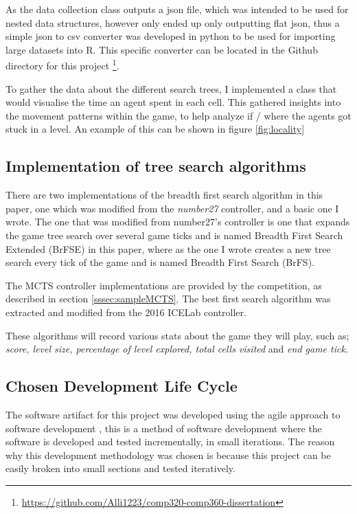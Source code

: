 \documentclass[journal]{IEEEtran}
\begin{document}
	As the data collection class outputs a json file, which was intended to be used for nested data structures, however only ended up only outputting flat json, thus a simple json to csv converter was developed in python to be used for importing large datasets into R. This specific converter can be located in the Github directory for this project \footnote{\url{https://github.com/Alli1223/comp320-comp360-dissertation}}.

	To gather the data about the different search trees, I implemented a class that would visualise the time an agent spent in each cell. 
	This gathered insights into the movement patterns within the game, to help analyze if / where the agents got stuck in a level. An example of this can be shown in figure \ref{fig:locality}

	
	\subsection{Implementation of tree search algorithms} \label{TSImplementation}
	There are two implementations of the breadth first search algorithm in this paper, one which was modified from the \textit{number27} controller, and  a basic one I wrote. The one that was modified from number27's controller is one that expands the game tree search over several game ticks and is named Breadth First Search Extended (BrFSE) in this paper, where as the one I wrote creates a new tree search every tick of the game and is named Breadth First Search (BrFS).
	
	The MCTS controller implementations are provided by the competition, as described in section \ref{sssec:sampleMCTS}.
	The best first search algorithm was extracted and modified from the 2016 ICELab controller.

	These algorithms will record various stats about the game they will play, such as; \textit{score, level size, percentage of level explored, total cells visited} and \textit{end game tick}.
	
	


		
	\subsection{Chosen Development Life Cycle}
		The software artifact for this project was developed using the agile approach to software development \cite{beck2001manifesto, cockburn2001agile, dybaa2008empirical}, this is a method of software development where the software is developed and tested incrementally, in small iterations. The reason why this development methodology was chosen is because this project can be easily broken into small sections and tested iteratively.
\end{document}

